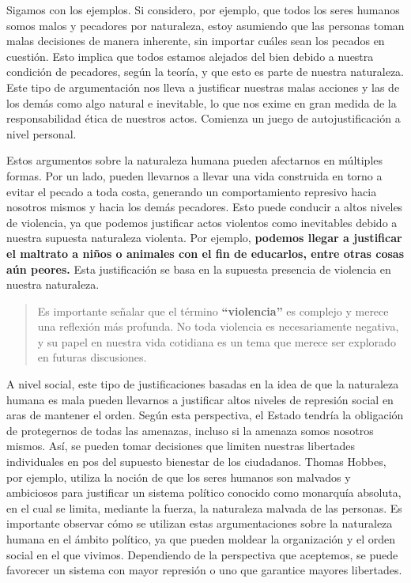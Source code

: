 \documentclass[
  jou,
  floatsintext,
  longtable,
  a4paper,
  nolmodern,
  notxfonts,
  notimes,
  12pt,
  colorlinks=true,linkcolor=blue,citecolor=blue,urlcolor=blue]{apa7}
\begin{document}
Sigamos con los ejemplos. Si considero, por ejemplo, que todos los seres
humanos somos malos y pecadores por naturaleza, estoy asumiendo que las
personas toman malas decisiones de manera inherente, sin importar cuáles
sean los pecados en cuestión. Esto implica que todos estamos alejados
del bien debido a nuestra condición de pecadores, según la teoría, y que
esto es parte de nuestra naturaleza. Este tipo de argumentación nos
lleva a justificar nuestras malas acciones y las de los demás como algo
natural e inevitable, lo que nos exime en gran medida de la
responsabilidad ética de nuestros actos. Comienza un juego de
autojustificación a nivel personal.

Estos argumentos sobre la naturaleza humana pueden afectarnos en
múltiples formas. Por un lado, pueden llevarnos a llevar una vida
construida en torno a evitar el pecado a toda costa, generando un
comportamiento represivo hacia nosotros mismos y hacia los demás
pecadores. Esto puede conducir a altos niveles de violencia, ya que
podemos justificar actos violentos como inevitables debido a nuestra
supuesta naturaleza violenta. Por ejemplo, \textbf{podemos llegar a
justificar el maltrato a niños o animales con el fin de educarlos, entre
otras cosas aún peores.} Esta justificación se basa en la supuesta
presencia de violencia en nuestra naturaleza.

\begin{quote}
Es importante señalar que el término \textbf{``violencia''} es complejo
y merece una reflexión más profunda. No toda violencia es necesariamente
negativa, y su papel en nuestra vida cotidiana es un tema que merece ser
explorado en futuras discusiones.
\end{quote}

A nivel social, este tipo de justificaciones basadas en la idea de que
la naturaleza humana es mala pueden llevarnos a justificar altos niveles
de represión social en aras de mantener el orden. Según esta
perspectiva, el Estado tendría la obligación de protegernos de todas las
amenazas, incluso si la amenaza somos nosotros mismos. Así, se pueden
tomar decisiones que limiten nuestras libertades individuales en pos del
supuesto bienestar de los ciudadanos. Thomas Hobbes, por ejemplo,
utiliza la noción de que los seres humanos son malvados y ambiciosos
para justificar un sistema político conocido como monarquía absoluta, en
el cual se limita, mediante la fuerza, la naturaleza malvada de las
personas. Es importante observar cómo se utilizan estas argumentaciones
sobre la naturaleza humana en el ámbito político, ya que pueden moldear
la organización y el orden social en el que vivimos. Dependiendo de la
perspectiva que aceptemos, se puede favorecer un sistema con mayor
represión o uno que garantice mayores libertades.
\end{document}
